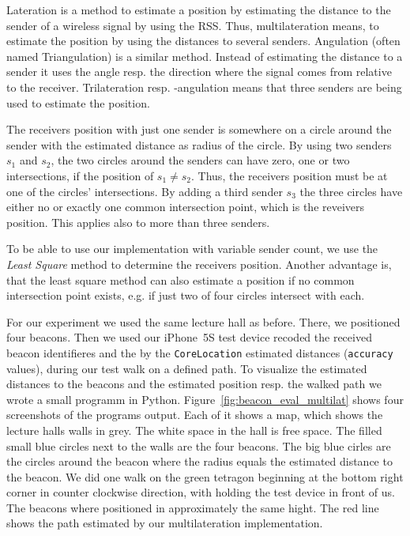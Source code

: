 Lateration is a method to estimate a position by estimating the distance to the sender of a wireless signal by using the \acs{RSS}.
Thus, multilateration means, to estimate the position by using the distances to several senders.
Angulation (often named Triangulation) is a similar method. Instead of estimating the distance to a sender it uses the angle resp. the direction where the signal comes from relative to the receiver.
Trilateration resp. -angulation means that three senders are being used to estimate the position.

The receivers position with just one sender is somewhere on a circle around the sender with the estimated distance as radius of the circle.
By using two senders $s_1$ and $s_2$, the two circles around the senders can have zero, one or two intersections, if the position of $s_1 \neq s_2$. Thus, the receivers position must be at one of the circles' intersections.
By adding a third sender $s_3$ the three circles have either no or exactly one common intersection point, which is the reveivers position.
This applies also to more than three senders.

To be able to use our implementation with variable sender count, we use the \emph{Least Square} method to determine the receivers position. Another advantage is, that the least square method can also estimate a position if no common intersection point exists, e.g. if just two of four circles intersect with each.

For our experiment we used the same lecture hall as before.
There, we positioned four beacons.
Then we used our iPhone~5S test device recoded the received beacon identifieres and the by the \texttt{CoreLocation} estimated distances (\texttt{accuracy} values), during our test walk on a defined path.
To visualize the estimated distances to the beacons and the estimated position resp. the walked path we wrote a small programm in Python.
Figure~\ref{fig:beacon_eval_multilat} shows four screenshots of the programs output.
Each of it shows a map, which shows the lecture halls walls in grey.
The white space in the hall is free space.
The filled small blue circles next to the walls are the four beacons.
The big blue cirles are the circles around the beacon where the radius equals the estimated distance to the beacon.
We did one walk on the green tetragon beginning at the bottom right corner in counter clockwise direction, with holding the test device in front of us. The beacons where positioned in approximately the same hight.
The red line shows the path estimated by our multilateration implementation.

